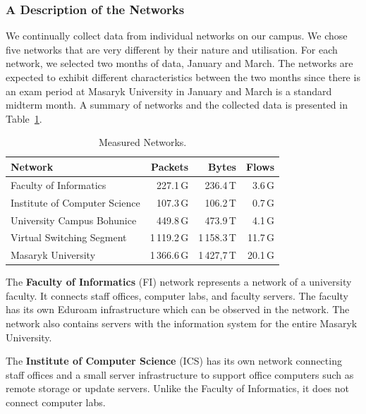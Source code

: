 \subsubsection{A Description of the Networks}

We continually collect data from individual networks on our campus. We chose five networks that are very different by their nature and utilisation. For each network, we selected two months of data, January and March. The networks are expected to exhibit different characteristics between the two months since there is an exam period at Masaryk University in January and March is a standard midterm month. A summary of networks and the collected data is presented in Table~\ref{tab:characterization-measured-networks}.

\begin{table}[!t]
        \centering
        \renewcommand{\arraystretch}{1.1}
        \begin{tabular}{|l|r|r|r|} \hline
            \textbf{Network} & \textbf{Packets} & \textbf{Bytes} & \textbf{Flows} \\ \hline
            Faculty of Informatics & 227.1\,G & 236.4\,T & 3.6\,G \\ \hline
            Institute of Computer Science & 107.3\,G & 106.2\,T & 0.7\,G \\ \hline
            University Campus Bohunice & 449.8\,G & 473.9\,T & 4.1\,G \\ \hline
            Virtual Switching Segment & 1\,119.2\,G & 1\,158.3\,T & 11.7\,G \\ \hline
            Masaryk University & 1\,366.6\,G & 1\,427,7\,T & 20.1\,G \\ \hline
        \end{tabular}
        \caption{Measured Networks.}
        \label{tab:characterization-measured-networks}
\end{table}

The \textbf{Faculty of Informatics} (FI) network represents a network of a university faculty. It connects staff offices, computer labs, and faculty servers. The faculty has its own Eduroam infrastructure which can be observed in the network. The network also contains servers with the information system for the entire Masaryk University.

The \textbf{Institute of Computer Science} (ICS) has its own network connecting staff offices and a small server infrastructure to support office computers such as remote storage or update servers. Unlike the Faculty of Informatics, it does not connect computer labs. 

